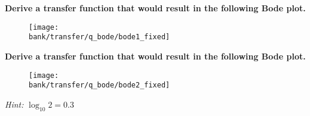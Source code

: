 

\begin{enumerate}

\qitem
  \textbf{Derive a transfer function that would result in the following Bode plot.}
  \begin{figure}[H]\centering
  \texttt{[image: \\bank/transfer/q\_bode/bode1\_fixed]}
  \end{figure}


\qitem
  \textbf{Derive a transfer function that would result in the following Bode plot.}
  \begin{figure}[H]\centering
  \texttt{[image: \\bank/transfer/q\_bode/bode2\_fixed]}
  \end{figure}
  \textit{Hint:} $\log_{10} 2 = 0.3$

\sol{

  \[H(\omega) = \frac{j 20 \omega}{\left(1 + j \omega\right)\left(1 + \frac{j\omega}{100}
  \right)}\]
  
}

%
%    
%
%
%  

\end{enumerate}
